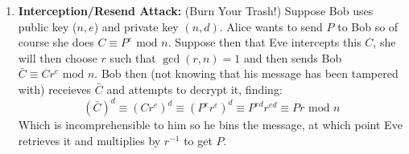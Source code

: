 \documentclass[class=article, crop=false]{standalone}
\begin{document}
\begin{enumerate}
	\item \textbf{Interception/Resend Attack:}
	(Burn Your Trash!)
	Suppose Bob uses public key ($n,e$) and private key $(n,d)$.
	Alice wants to send $P$ to Bob so of course she does $C\equiv P^e\mbox{ mod }n$.
	Suppose then that Eve intercepts this $C$, she will then choose $r$ such that
	$\gcd(r,n)=1$ and then sends Bob $\bar{C}\equiv Cr^e \mbox{ mod }n$.
	Bob then (not knowing that his message has been tampered with) 
	receieves $\bar{C}$ and attempts to decrypt it, finding:
	$$(\bar{C})^d\equiv (Cr^e)^d\equiv (P^er^e)^d\equiv P^{ed}r^{ed} \equiv Pr\mbox{ mod }n$$
	Which is incomprehensible to him so he bins the message,
	at which point Eve retrieves it and multiplies by $r^{-1}$ to get $P$.
\end{enumerate}

\end{document}
